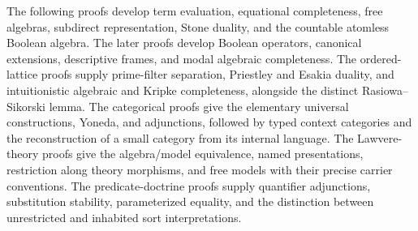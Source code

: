 \label{annex:p10}

The following proofs develop term evaluation, equational completeness,
free algebras, subdirect representation, Stone duality, and the
countable atomless Boolean algebra.
The later proofs develop Boolean operators, canonical extensions,
descriptive frames, and modal algebraic completeness.
The ordered-lattice proofs supply prime-filter separation,
Priestley and Esakia duality, and intuitionistic algebraic and
Kripke completeness, alongside the distinct Rasiowa--Sikorski lemma.
The categorical proofs give the elementary universal constructions,
Yoneda, and adjunctions, followed by typed context categories and
the reconstruction of a small category from its internal language.
The Lawvere-theory proofs give the algebra/model equivalence,
named presentations, restriction along theory morphisms, and
free models with their precise carrier conventions.
The predicate-doctrine proofs supply quantifier adjunctions,
substitution stability, parameterized equality, and the distinction
between unrestricted and inhabited sort interpretations.

























